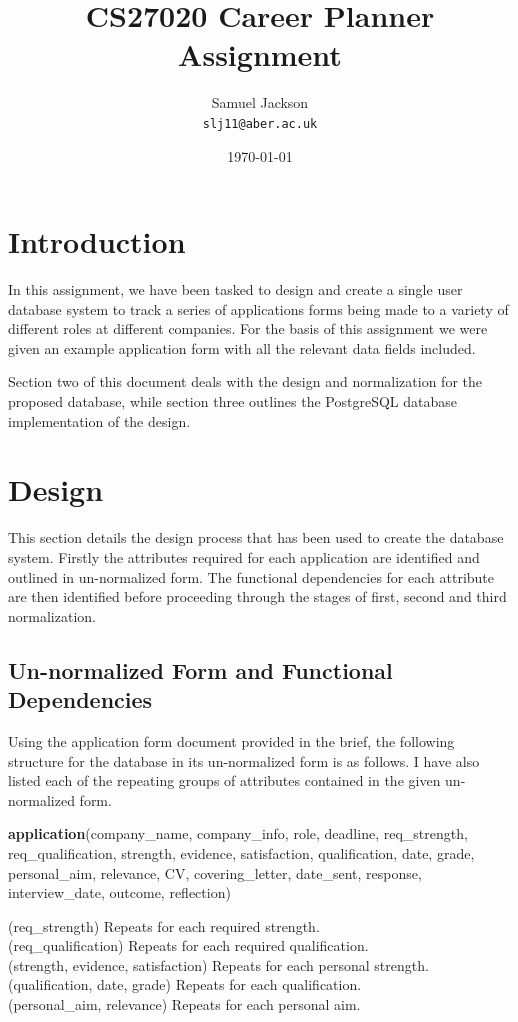 \documentclass{article}
\begin{document}
\title{CS27020 Career Planner Assignment}
\author{Samuel Jackson \\ \texttt{slj11@aber.ac.uk}}
\date{\today}
\maketitle

\section{Introduction}
In this assignment, we have been tasked to design and create a single user database system to track a series of applications forms being made to a variety of different roles at different companies. For the basis of this assignment we were given an example application form with all the relevant data fields included.

Section two of this document deals with the design and normalization for the proposed database, while section three outlines the PostgreSQL database implementation of the design.

\section{Design}
This section details the design process that has been used to create the database system. Firstly the attributes required for each application are identified and outlined in un-normalized form. The functional dependencies for each attribute are then identified before proceeding through the stages of first, second and third normalization.

\subsection{Un-normalized Form and Functional Dependencies}
Using the application form document provided in the brief, the following structure for the database in its un-normalized form is as follows. I have also listed each of the repeating groups of attributes contained in the given un-normalized form.

\textbf{application}(company\_name, company\_info, role, deadline, req\_strength, req\_qualification, strength, evidence, satisfaction, qualification, date, grade, personal\_aim, relevance, CV, covering\_letter, date\_sent, response, interview\_date, outcome, reflection)

(req\_strength) Repeats for each required strength.\\
(req\_qualification) Repeats for each required qualification.\\
(strength, evidence, satisfaction) Repeats for each personal strength.\\
(qualification, date, grade) Repeats for each qualification.\\
(personal\_aim, relevance) Repeats for each personal aim.\\
\end{document}
